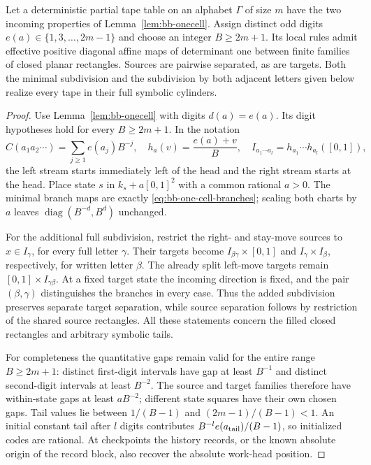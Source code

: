 \begin{lemma}\label{ba:rectangles}
Let a deterministic partial tape table on an alphabet $\Gamma$ of size
$m$ have the two incoming properties of Lemma~\ref{lem:bb-onecell}.
Assign distinct odd digits $e(a)\in\{1,3,\ldots,2m-1\}$ and choose
an integer $B\ge2m+1$.  Its local rules admit effective positive diagonal
affine maps of determinant one between finite families of closed planar
rectangles.  Sources are pairwise separated, as are targets.  Both the
minimal subdivision and the subdivision by both adjacent letters given
below realize every tape in their full symbolic cylinders.
\end{lemma}
\begin{proof}\label{ba:rectangles-proof}
Use Lemma~\ref{lem:bb-onecell} with digits $d(a)=e(a)$.  Its digit
hypotheses hold for every $B\ge2m+1$.  In the notation
\[
 C(a_1a_2\cdots)=\sum_{j\ge1}e(a_j)B^{-j},\quad
 h_a(v)=\frac{e(a)+v}{B},\quad
 I_{a_1\cdots a_l}=h_{a_1}\cdots h_{a_l}([0,1]),
\]
the left stream starts immediately left of the head and the right stream
starts at the head.  Place state $s$ in $k_s+a[0,1]^2$ with a common
rational $a>0$.  The minimal branch maps are exactly
\eqref{eq:bb-one-cell-branches}; scaling both charts by $a$ leaves
$\operatorname{diag}(B^{-d},B^d)$ unchanged.

For the additional full subdivision, restrict the right- and stay-move
sources to $x\in I_\gamma$, for every full letter $\gamma$.
Their targets become $I_{\beta\gamma}\times[0,1]$ and
$I_\gamma\times I_\beta$, respectively, for written letter $\beta$.
The already split left-move targets remain
$[0,1]\times I_{\gamma\beta}$.  At a fixed target state the
incoming direction is fixed, and the pair $(\beta,\gamma)$
distinguishes the branches in every case.  Thus the added subdivision
preserves separate target separation, while source separation follows
by restriction of the shared source rectangles.  All these statements
concern the filled closed rectangles and arbitrary symbolic tails.

For completeness the quantitative gaps remain valid for the entire
range $B\ge2m+1$: distinct first-digit intervals have gap at least
$B^{-1}$ and distinct second-digit intervals at least $B^{-2}$.
The source and target families therefore have within-state gaps at
least $aB^{-2}$; different state squares have their own chosen gaps.
Tail values lie between $1/(B-1)$ and $(2m-1)/(B-1)<1$.
An initial constant tail after $l$ digits contributes
$B^{-l}e(a_{\rm tail})/(B-1)$, so initialized codes are rational.
At checkpoints the history records, or the known absolute origin of
the record block, also recover the absolute work-head position.
\end{proof}


